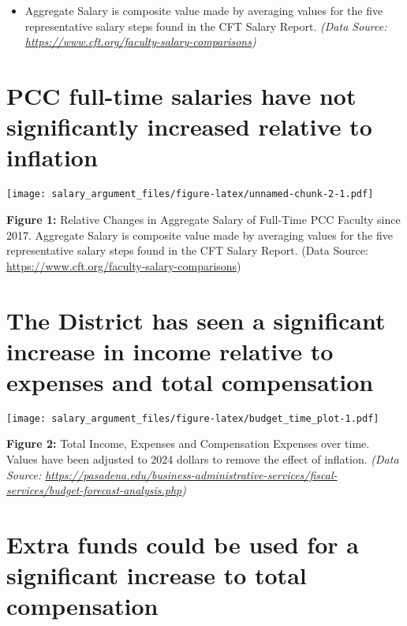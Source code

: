 \documentclass[
]{article}
\providecommand{\tightlist}{%
  \setlength{\itemsep}{0pt}\setlength{\parskip}{0pt}}
\begin{document}
\begin{itemize}
\tightlist
\item
  Aggregate Salary is composite value made by averaging values for the
  five representative salary steps found in the CFT Salary Report.
  \emph{(Data Source:
  \url{https://www.cft.org/faculty-salary-comparisons})}
\end{itemize}

\section{PCC full-time salaries have not significantly increased
relative to
inflation}\label{pcc-full-time-salaries-have-not-significantly-increased-relative-to-inflation}

\texttt{[image: salary\_argument\_files/figure-latex/unnamed-chunk-2-1.pdf]}

\textbf{Figure 1:} Relative Changes in Aggregate Salary of Full-Time PCC
Faculty since 2017. Aggregate Salary is composite value made by
averaging values for the five representative salary steps found in the
CFT Salary Report. (Data Source:
\url{https://www.cft.org/faculty-salary-comparisons})

\section{The District has seen a significant increase in income relative
to expenses and total
compensation}\label{the-district-has-seen-a-significant-increase-in-income-relative-to-expenses-and-total-compensation}

\texttt{[image: salary\_argument\_files/figure-latex/budget\_time\_plot-1.pdf]}

\textbf{Figure 2:} Total Income, Expenses and Compensation Expenses over
time. Values have been adjusted to 2024 dollars to remove the effect of
inflation. \emph{(Data Source:
\url{https://pasadena.edu/business-administrative-services/fiscal-services/budget-forecast-analysis.php})}

\section{Extra funds could be used for a significant increase to total
compensation}\label{extra-funds-could-be-used-for-a-significant-increase-to-total-compensation}
\end{document}
